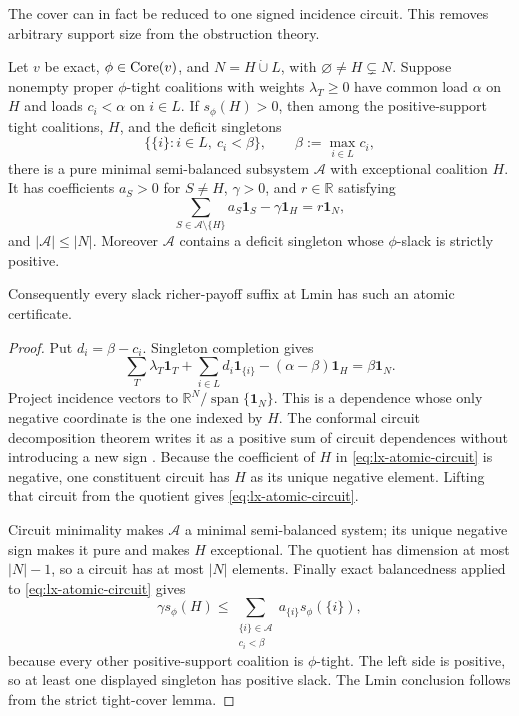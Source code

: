 The cover can in fact be reduced to one signed incidence circuit.  This
removes arbitrary support size from the obstruction theory.

\begin{theorem}
\label{thm:lx-atomic-obstruction}
Let $v$ be exact, $\phi\in\operatorname{Core}(v)$, and
$N=H\mathbin{\dot\cup}L$, with $\varnothing\ne H\subsetneq N$.
Suppose nonempty proper $\phi$-tight coalitions with weights $\lambda_T\geq0$ have common
load $\alpha$ on $H$ and loads $c_i<\alpha$ on $i\in L$.  If
$s_\phi(H)>0$, then among the positive-support tight coalitions, $H$, and
the deficit singletons
\[
 \{\{i\}:i\in L,\ c_i<\beta\},
 \qquad \beta:=\max_{i\in L}c_i,
\]
there is a pure minimal semi-balanced subsystem $\mathcal A$ with exceptional
coalition $H$.  It has coefficients $a_S>0$ for $S\ne H$, $\gamma>0$, and
$r\in\mathbb R$ satisfying
\[
 \sum_{S\in\mathcal A\setminus\{H\}}a_S\mathbf1_S
 -\gamma\mathbf1_H=r\mathbf1_N,                     \tag{AC}
 \label{eq:lx-atomic-circuit}
\]
and $|\mathcal A|\leq |N|$.  Moreover $\mathcal A$ contains a deficit
singleton whose $\phi$-slack is strictly positive.

Consequently every slack richer-payoff suffix at Lmin has such an atomic
certificate.
\end{theorem}

\begin{proof}
Put $d_i=\beta-c_i$.  Singleton completion gives
\[
 \sum_T\lambda_T\mathbf1_T+\sum_{i\in L}d_i\mathbf1_{\{i\}}
 -(\alpha-\beta)\mathbf1_H=\beta\mathbf1_N.          \tag{AC0}
\]
Project incidence vectors to
$\mathbb R^N/\operatorname{span}\{\mathbf1_N\}$.  This is a dependence
whose only negative coordinate is the one indexed by $H$.  The conformal
circuit decomposition theorem writes it as a positive sum of circuit
dependences without introducing a new sign
\citep[see, e.g.,][]{BjornerEtAl1999}.  Because the coefficient of $H$ in
\eqref{eq:lx-atomic-circuit} is negative, one constituent circuit has $H$
as its unique negative element.  Lifting that circuit from the quotient
gives \eqref{eq:lx-atomic-circuit}.

Circuit minimality makes $\mathcal A$ a minimal semi-balanced system; its
unique negative sign makes it pure and makes $H$ exceptional.  The quotient
has dimension at most $|N|-1$, so a circuit has at most $|N|$ elements.
Finally exact balancedness applied to \eqref{eq:lx-atomic-circuit} gives
\[
 \gamma s_\phi(H)\leq
 \sum_{\substack{\{i\}\in\mathcal A\\c_i<\beta}}
 a_{\{i\}}s_\phi(\{i\}),
\]
because every other positive-support coalition is $\phi$-tight.  The left
side is positive, so at least one displayed singleton has positive slack.
The Lmin conclusion follows from the strict tight-cover lemma.
\end{proof}

